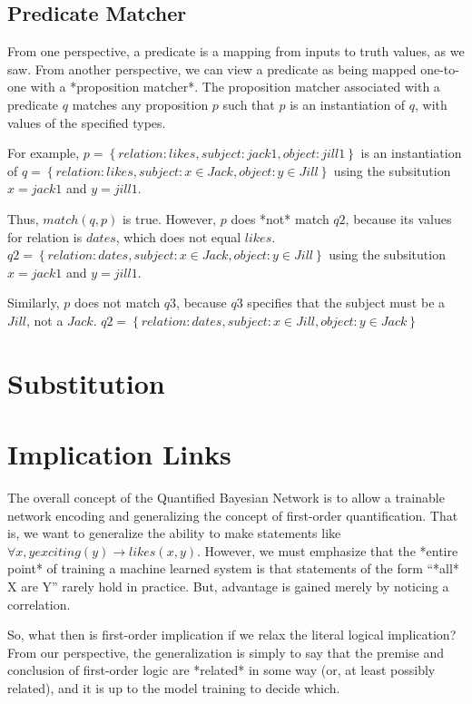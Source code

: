 \documentclass[12pt]{article}
\begin{document}
\subsection{Predicate Matcher}
From one perspective, a predicate is a mapping from inputs to truth values, as we saw.
From another perspective, we can view a predicate as being mapped one-to-one with a *proposition matcher*.
The proposition matcher associated with a predicate $q$ matches any proposition $p$ such that $p$ is an instantiation of $q$, with values of the specified types.

For example, 
$p = \left\{relation:likes, subject:jack1, object:jill1 \right\}$
is an instantiation of
$q = \left\{relation:likes, subject:{x \in Jack}, object:{y \in Jill} \right\}$
using the subsitution $x=jack1$ and $y=jill1$.

Thus, $match(q, p)$ is true.
However, $p$ does *not* match $q2$, because its values for relation is $dates$, which does not equal $likes$.
$q2 = \left\{relation:dates, subject:{x \in Jack}, object:{y \in Jill} \right\}$
using the subsitution $x=jack1$ and $y=jill1$.

Similarly, $p$ does not match $q3$, because $q3$ specifies that the subject must be a $Jill$, not a $Jack$.
$q2 = \left\{relation:dates, subject:{x \in Jill}, object:{y \in Jack} \right\}$

\section{Substitution}
\section{Implication Links}
The overall concept of the Quantified Bayesian Network is to allow a trainable network encoding and generalizing the concept of first-order quantification.
That is, we want to generalize the ability to make statements like $\forall x, y exciting(y) \rightarrow likes(x, y)$.
However, we must emphasize that the *entire point* of training a machine learned system is that statements of the form ``*all* X are Y'' rarely hold in practice.
But, advantage is gained merely by noticing a correlation.

So, what then is first-order implication if we relax the literal logical implication?
From our perspective, the generalization is simply to say that the premise and conclusion of first-order logic are *related* in some way (or, at least possibly related), and it is up to the model training to decide which.
\end{document}
